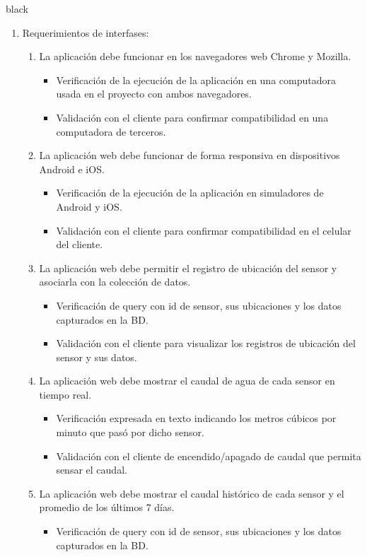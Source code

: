 \documentclass[
11pt, %
codirector, %
]{charter}
\begin{document}
\begin{consigna}{black}
\begin{enumerate}
\item Requerimientos de interfases:
	\begin{enumerate}
		\item La aplicación debe funcionar en los navegadores web Chrome y Mozilla.
			\begin{itemize}
				\item Verificación de la ejecución de la aplicación en una computadora usada en el proyecto con ambos navegadores.
				\item Validación con el cliente para confirmar compatibilidad en una computadora de terceros. 
			\end{itemize}
		\item La aplicación web debe funcionar de forma responsiva en dispositivos Android e iOS.
			\begin{itemize}
				\item Verificación de la ejecución de la aplicación en simuladores de Android y iOS.
				\item Validación con el cliente para confirmar compatibilidad en el celular del cliente. 
			\end{itemize}
		\item La aplicación web debe permitir el registro de ubicación del sensor y asociarla con la colección de datos.
			\begin{itemize}
				\item Verificación de query con id de sensor, sus ubicaciones y los datos capturados en la BD.
				\item Validación con el cliente para visualizar los registros de ubicación del sensor y sus datos. 
			\end{itemize}
		\item La aplicación web debe mostrar el caudal de agua de cada sensor en tiempo real. 
			\begin{itemize}
				\item Verificación expresada en texto indicando los metros cúbicos por minuto que pasó por dicho sensor.
				\item Validación con el cliente de encendido/apagado de caudal que permita sensar el caudal.  
			\end{itemize}
		\item La aplicación web debe mostrar el caudal histórico de cada sensor y el promedio de los últimos 7 días.
			\begin{itemize}
				\item Verificación de query con id de sensor, sus ubicaciones y los datos capturados en la BD.

\end{itemize}
\end{enumerate}
\end{enumerate}
\end{consigna}
\end{document}

